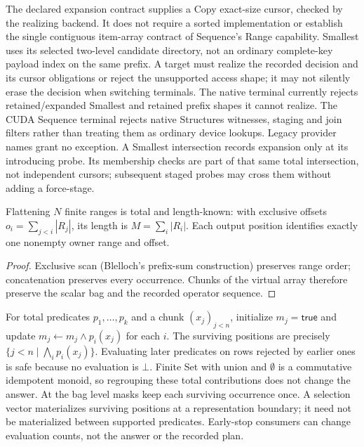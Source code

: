 \begin{mathpar}
\end{mathpar}
The declared expansion contract supplies a Copy exact-size cursor, checked by
the realizing backend. It does not require a sorted implementation or establish
the single contiguous item-array contract of Sequence's Range capability.
Smallest uses its selected two-level candidate directory, not an ordinary
complete-key payload index on the same prefix. A target must realize the
recorded decision and its cursor obligations or reject the unsupported access
shape; it may not silently erase the decision when switching terminals.
The native terminal currently rejects retained/expanded Smallest and retained
prefix shapes it cannot realize. The CUDA Sequence terminal rejects native
Structures witnesses, staging and join filters rather than treating them as
ordinary device lookups. Legacy provider names grant no exception.
A Smallest intersection records expansion only at its introducing probe.
Its membership checks are part of that same total intersection, not independent
cursors; subsequent staged probes may cross them without adding a force-stage.
\begin{lemma}
Flattening $N$ finite ranges is total and length-known: with exclusive
offsets $o_i=\sum_{j<i}|R_j|$, its length is $M=\sum_i|R_i|$.
Each output position identifies exactly one nonempty owner range and offset.
\end{lemma}
\begin{proof}
Exclusive scan (Blelloch's prefix-sum construction) preserves range order;
concatenation preserves every occurrence. Chunks of the virtual array
therefore preserve the scalar bag and the recorded operator sequence.
\end{proof}

For total predicates $p_1,\ldots,p_k$ and a chunk $(x_j)_{j<n}$, initialize
$m_j=\mathsf{true}$ and update $m_j\gets m_j\land p_i(x_j)$ for each $i$.
The surviving positions are precisely
$\{j<n\mid\bigwedge_i p_i(x_j)\}$. Evaluating later predicates on rows rejected
by earlier ones is safe because no evaluation is $\bot$. Finite Set with
union and $\emptyset$ is a commutative idempotent monoid, so regrouping these
total contributions does not change the answer. At the bag level masks keep
each surviving occurrence once. A selection vector materializes surviving
positions at a representation boundary; it need not be materialized between
supported predicates. Early-stop consumers can change evaluation counts,
not the answer or the recorded plan.

